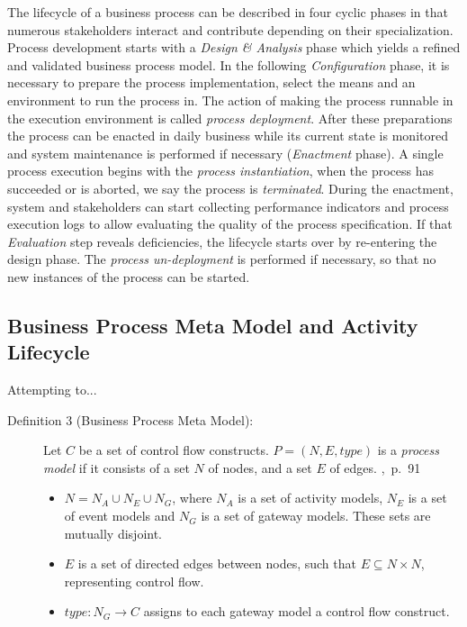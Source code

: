 \noindent
The lifecycle of a business process can be  described in four cyclic phases in that numerous stakeholders interact and contribute depending on their specialization.
Process development starts with a \emph{Design \& Analysis} phase which yields a refined and validated business process model.
In the following \emph{Configuration} phase, it is necessary to prepare the process implementation, select the means and an environment to run the process in.
The action of making the process runnable in the execution environment is called \emph{process deployment}.
After these preparations the process can be enacted in daily business while its current state is monitored and system maintenance is performed if necessary (\emph{Enactment} phase). 
A single process execution begins with the \emph{process instantiation}, when the process has succeeded or is aborted, we say the process is \emph{terminated}.
During the enactment, system and stakeholders can start collecting performance indicators and process execution logs to allow evaluating the quality of the process specification. If that \emph{Evaluation} step reveals deficiencies, the lifecycle starts over by re-entering the design phase.
The \emph{process un-deployment} is performed if necessary, so that no new instances of the process can be started.
\cite[p.~11~ff.]{weske:bpm-book}

\subsection{Business Process Meta Model and Activity Lifecycle}\label{ch:bg:bpmetamodel}
Attempting to...

\begin{description}
	\item[Definition 3 (Business Process Meta Model):]
	Let $C$ be a set of control flow constructs. $P = (N,E,type)$ is a \textit{process model} if it consists of a set $N$ of nodes, and a set $E$ of edges. \cite{weske:bpm-book},~p.~91
	\begin{itemize} 
		\item
		$N = N_{A}\cup N_{E}\cup N_{G}$, where $N_{A}$ is a set of activity models, $N_{E}$ is a set of event models and $N_{G}$ is a set of gateway models. These sets are mutually disjoint.
		\item 
		$E$ is a set of directed edges between nodes, such that $E\subseteq N \times N$, representing control flow.
		\item
		$type:N_{G}\rightarrow C$ assigns to each gateway model a control flow construct.
	\end{itemize}
\end{description}

